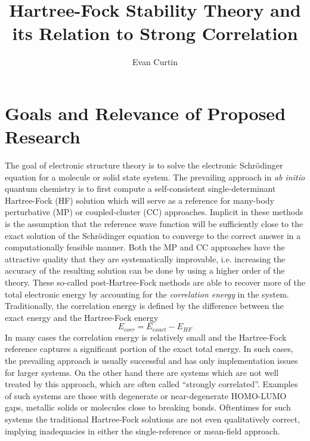 \documentclass{revtex4}
\begin{document}
\title{Hartree-Fock Stability Theory and its Relation to Strong Correlation}
\author{Evan Curtin}
\maketitle

\section{Goals and Relevance of Proposed Research}
    The goal of electronic structure theory is to solve the electronic Schr{\"o}dinger equation
    for a molecule or solid state system. The prevailing approach in \emph{ab initio} quantum 
    chemistry is to first compute a self-consistent single-determinant Hartree-Fock (HF) solution 
    which will serve as a reference for many-body perturbative (MP) or coupled-cluster (CC) 
    approaches.  
    Implicit in these methods is the assumption that the reference wave function will be 
    sufficiently close to the exact solution of the Schr{\"o}dinger equation to converge to the 
    correct 
    answer in a computationally feasible manner. Both the MP and CC approaches have the attractive 
    quality that they are systematically improvable, i.e. increasing the accuracy of the resulting 
    solution can be done by using a higher order of the theory. These so-called post-Hartree-Fock 
    methods are able to recover more of the total electronic energy by accounting for the 
    \emph{correlation energy} in the system. Traditionally, the correlation energy is defined by 
    the difference between the exact energy and the Hartree-Fock energy \cite{Shavitt2009}
    \begin{equation}\label{correlation_energy}
      E_{corr} = E_{exact} -  E_{HF}
    \end{equation}
    In many cases the correlation energy is relatively small and the Hartree-Fock reference 
    captures a significant portion of the exact total energy. In such cases, the prevailing 
    approach is usually successful and has only implementation issues for larger systems. On the 
    other hand there are systems which are not well treated by this approach, which are often 
    called ``strongly correlated''. Examples of such systems are those with degenerate or 
    near-degenerate HOMO-LUMO gaps, metallic solids or molecules close to breaking bonds. 
    Oftentimes for such systems the traditional Hartree-Fock solutions are not even qualitatively 
    correct, implying inadequacies in either the single-reference or mean-field approach. 
      
\end{document}
